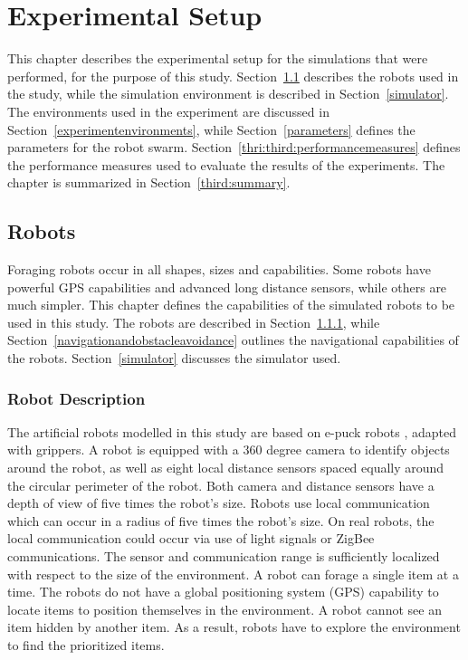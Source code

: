 
\chapter{Experimental Setup}
\label{chap:experiment}


This chapter describes the experimental setup for the simulations that were performed, for the purpose of this study. Section~\ref{chap:robots} describes the robots used in the study, while the simulation environment is described in Section~\ref{simulator}. The environments used in the experiment are discussed in Section~\ref{experimentenvironments}, while Section~\ref{parameters} defines the parameters for the robot swarm. Section~\ref{thri:third:performancemeasures} defines the performance measures used to evaluate the results of the experiments. The chapter is summarized in Section~\ref{third:summary}.


\section{Robots}
\label{chap:robots}

Foraging robots occur in all shapes, sizes and capabilities. Some robots have powerful GPS capabilities and advanced long distance sensors, while others are much simpler. This chapter defines the capabilities of the simulated robots to be used in this study. The robots are described in Section~\ref{robotdescription}, while Section~\ref{navigationandobstacleavoidance} outlines the navigational capabilities of the robots. Section~\ref{simulator} discusses the simulator used.

\subsection{Robot Description}
\label{robotdescription}

The artificial robots modelled in this study are based on e-puck robots \cite{mondada2009puck}, adapted with grippers. A robot is equipped with a 360 degree camera to identify objects around the robot, as well as eight local distance sensors spaced equally around the circular perimeter of the robot. Both camera and distance sensors have a depth of view of five times the robot's size. Robots use local communication which can occur in a radius of five times the robot's size. On real robots, the local communication could occur via use of light signals or ZigBee communications. The sensor and communication range is sufficiently localized with respect to the size of the environment. A robot can forage a single item at a time. The robots do not have a global positioning system (GPS) capability to locate items to position themselves in the environment. A robot cannot see an item hidden by another item. As a result, robots have to explore the environment to find the prioritized items.

